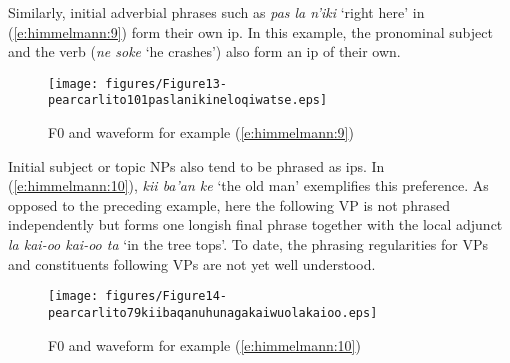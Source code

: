 \documentclass[output=paper
,modfonts
,nonflat]{langsci/langscibook}
\begin{document}
\noindent
Similarly, initial adverbial phrases such as \textit{pas la n'iki} ‘right here’ in (\ref{e:himmelmann:9}) form their own ip. In this example, the pronominal subject and the verb (\textit{ne soke} ‘he crashes’) also form an ip of their own. 


\begin{figure}
	\texttt{[image: figures/Figure13-pearcarlito101paslanikineloqiwatse.eps]}
	\caption{F0 and waveform for example (\ref{e:himmelmann:9})}
	\label{f13}
\end{figure}

\noindent
Initial subject or topic NPs also tend to be phrased as ips. In (\ref{e:himmelmann:10}), \textit{kii ba'an ke} ‘the old man’ exemplifies this preference. As opposed to the preceding example, here the following VP is not phrased independently but forms one longish final phrase together with the local adjunct \textit{la kai-oo kai-oo ta} ‘in the tree tops’. To date, the phrasing regularities for VPs and constituents following VPs are not yet well understood. 


\begin{figure}
	\texttt{[image: figures/Figure14-pearcarlito79kiibaqanuhunagakaiwuolakaioo.eps]}
	\caption{F0 and waveform for example (\ref{e:himmelmann:10})}
	\label{f14}
\end{figure}
\end{document}
